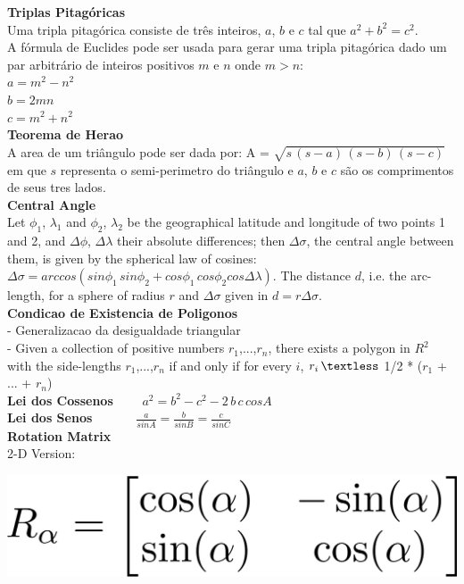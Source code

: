 \documentclass[10pt, twocolumn]{article}
\begin{document}
\begin{flushleft}
\textbf{Triplas Pitagóricas}\\
Uma tripla pitagórica consiste de três inteiros, $a$, $b$ e $c$ tal que $a^2 + b^2 = c^2$.\\
A fórmula de Euclides pode ser usada para gerar uma tripla pitagórica dado um par arbitrário de inteiros positivos $m$ e $n$ onde $m > n$:\\
$a = m^2 - n^2$\\
$b = 2mn$\\
$c = m^2 + n^2$\\[0.5cm]

\textbf{Teorema de Herao}\\
A area de um triângulo pode ser dada por: A = $\sqrt{s\,(s-a)\,(s-b)\,(s-c)}$ em que $s$ representa o semi-perimetro do triângulo e $a$, $b$ e $c$ são os comprimentos de seus tres lados.\\[0.5cm]

\textbf{Central Angle}\\
Let $\phi_1$, $\lambda_1$ and $\phi_2$, $\lambda_2$ be the geographical latitude and longitude of two points 1 and 2, and $\Delta\phi$, $\Delta\lambda$ their absolute differences; then $\Delta\sigma$, the central angle between them, is given by the spherical law of cosines: $\Delta\sigma = arccos(sin\phi_1 \, sin\phi_2 + cos\phi_1 \, cos\phi_2 cos\Delta\lambda).$ The distance $d$, i.e. the arc-length, for a sphere of radius $r$ and $\Delta\sigma$ given in $d = r\Delta\sigma$.\\[0.5cm]

\textbf{Condicao de Existencia de Poligonos}\\
- Generalizacao da desigualdade triangular\\
- Given a collection of positive numbers $r_1$,...,$r_n$, there exists a polygon in $R^{2}$ with the side-lengths $r_1$,...,$r_n$ if and only if for every $i$, $r_i \, \textless $  1/2 * ($r_1$ + ... + $r_n$)\\[0.5cm]

\textbf{Lei dos Cossenos} $\qquad a^{2} = b^{2} - c^{2} - 2\,b\,c\,cosA$\\
\textbf{Lei dos Senos} $\, \quad \qquad \frac{a}{sin A} = \frac{b}{sin B} = \frac{c}{sin C}$\\[2.5cm]

\textbf{Rotation Matrix}\\
2-D Version:\\
\begin{center}
\includegraphics[scale=0.3]{rm.png}
\end{center}


\end{flushleft}
\end{document}
